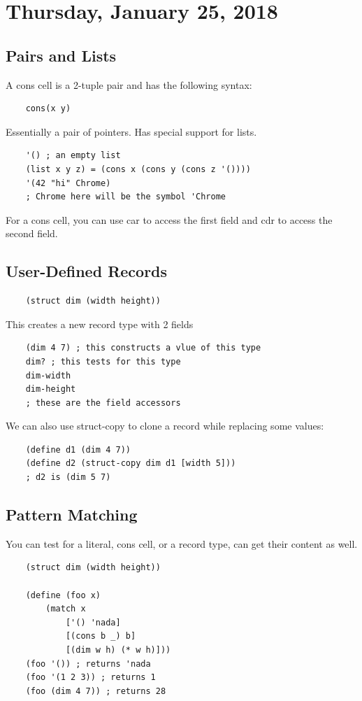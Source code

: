 \documentclass[12pt]{article}
\begin{document}
\section{Thursday, January 25, 2018}

\subsection{Pairs and Lists}

A cons cell is a 2-tuple pair and has the following syntax:
\begin{lstlisting}
	cons(x y)
\end{lstlisting}
Essentially a pair of pointers. Has special support for lists.
\begin{lstlisting}
	'() ; an empty list
	(list x y z) = (cons x (cons y (cons z '())))
	'(42 "hi" Chrome)
	; Chrome here will be the symbol 'Chrome
\end{lstlisting}

For a cons cell, you can use car to access the first field and cdr to access the second field.

\subsection{User-Defined Records}

\begin{lstlisting}
	(struct dim (width height))
\end{lstlisting}
This creates a new record type with 2 fields
\begin{lstlisting}
	(dim 4 7) ; this constructs a vlue of this type
	dim? ; this tests for this type
	dim-width
	dim-height
	; these are the field accessors
\end{lstlisting}

We can also use struct-copy to clone a record while replacing some values:
\begin{lstlisting}
	(define d1 (dim 4 7))
	(define d2 (struct-copy dim d1 [width 5]))
	; d2 is (dim 5 7)
\end{lstlisting}

\subsection{Pattern Matching}

You can test for a literal, cons cell, or a record type, can get their content as well.

\begin{lstlisting}
	(struct dim (width height))

	(define (foo x)
		(match x
			['() 'nada]
			[(cons b _) b]
			[(dim w h) (* w h)]))
	(foo '()) ; returns 'nada
	(foo '(1 2 3)) ; returns 1
	(foo (dim 4 7)) ; returns 28
\end{lstlisting}
\end{document}

